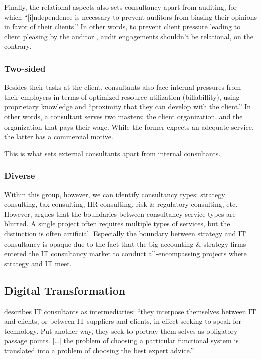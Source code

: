 \documentclass[12pt]{article}
\begin{document}
Finally, the relational aspects also sets consultancy apart from
auditing, for which ``{[}i{]}ndependence is necessary to prevent
auditors from biasing their opinions in favor of their clients.''
\citep[ 310]{bazerman2011} In other words, to prevent client pressure
leading to client pleasing by the auditor \citep{koch2017}, audit
engagements shouldn't be relational, on the contrary.

\hypertarget{two-sided}{%
\subsubsection{Two-sided}\label{two-sided}}

Besides their tasks at the client, consultants also face internal
pressures from their employers in terms of optimized resource
utilization (billabillity), using proprietary knowledge and ``proximity
that they can develop with the client.'' \citet[138]{chowdhury2021} In
other words, a consultant serves two masters: the client organization,
and the organization that pays their wage. While the former expects an
adequate service, the latter has a commercial motive. \citep[
270]{furusten2012}

This is what sets external consultants apart from internal consultants.

\hypertarget{diverse}{%
\subsubsection{Diverse}\label{diverse}}

Within this group, however, we can identify consultancy types: strategy
consulting, tax consulting, HR consulting, risk \& regulatory
consulting, etc. However, \citet[71-72]{armbruster2006} argues that the
boundaries between consultancy service types are blurred. A single
project often requires multiple types of services, but the distinction
is often artificial. Especially the boundary between strategy and IT
consultancy is opaque due to the fact that the big accounting \&
strategy firms entered the IT consultancy market to conduct
all-encompassing projects where strategy and IT meet.

\hypertarget{digital-transformation}{%
\subsection{Digital Transformation}\label{digital-transformation}}

\citet[28]{bloomfield1995} describes IT consultants as intermediaries:
``they interpose themselves between IT and clients, or between IT
suppliers and clients, in effect seeking to speak for technology. Put
another way, they seek to portray them selves as obligatory passage
points. {[}\ldots{]} the problem of choosing a particular functional
system is translated into a problem of choosing the best expert
advice.''
\end{document}
